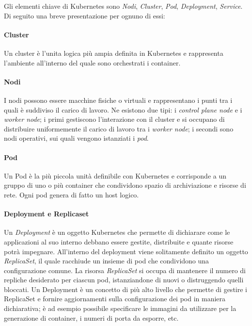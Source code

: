 	Gli elementi chiave di Kubernetes sono \emph{Nodi}, \emph{Cluster}, \emph{Pod}, \emph{Deployment}, \emph{Service}.
	Di seguito una breve presentazione per ognuno di essi:
	
	
\paragraph{Cluster}
	Un cluster è l'unita logica più ampia definita in Kubernetes e rappresenta l'ambiente all'interno del quale sono orchestrati i container.
	
	
\paragraph{Nodi}
	I nodi possono essere macchine fisiche o virtuali e rappresentano i punti tra i quali è suddiviso il carico di lavoro.
	Ne esistono due tipi: i \emph{control plane node} e i \emph{worker node}; i primi gestiscono l'interazione con il cluster e si occupano di distribuire uniformemente il carico di lavoro tra i \emph{worker node}; i secondi sono nodi operativi, sui quali vengono istanziati i \emph{pod}\cite{doc:kube-nodes}.


\paragraph{Pod}
	Un Pod è la più piccola unità definibile con Kubernetes e corrisponde a un gruppo di uno o più container che condividono spazio di archiviazione e risorse di rete.
	Ogni pod genera di fatto un host logico\cite{doc:kube-pod}.


\paragraph{Deployment e Replicaset}
	Un \emph{Deployment} è un oggetto Kubernetes che permette di dichiarare come le applicazioni al suo interno debbano essere gestite, distribuite e quante risorse potrà impegnare.
	All'interno del deployment viene solitamente definito un oggetto \emph{ReplicaSet}, il quale racchiude un insieme di pod che condividono una configurazione comune.
	La risorsa \emph{ReplicaSet} si occupa di mantenere il numero di repliche desiderato per ciascun pod, istanziandone di nuovi o distruggendo quelli bloccati.
	Un Deployment è un concetto di più alto livello che permette di gestire i ReplicaSet e fornire aggiornamenti sulla configurazione dei pod in maniera dichiarativa\cite{doc:kube-replicaset};
	è ad esempio possibile specificare le immagini da utilizzare per la generazione di container, i numeri di porta da esporre, etc.

